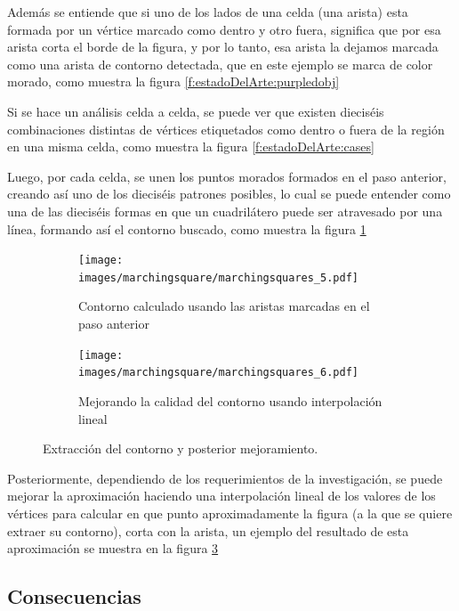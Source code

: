Además se entiende que si uno de los lados de una celda (una arista) esta formada por un
vértice marcado como dentro y otro fuera, significa que por esa arista corta el borde de la figura,
y por lo tanto, esa arista la dejamos marcada como una arista de contorno detectada, que en este
ejemplo se marca de color morado, como muestra la figura \ref{f:estadoDelArte:purpledobj}

Si se hace un análisis celda a celda, se puede ver que existen dieciséis combinaciones distintas de
vértices etiquetados como dentro o fuera de la región en una misma celda, como muestra la figura
\ref{f:estadoDelArte:cases}

Luego, por cada celda, se unen los puntos morados formados en el paso anterior, creando
así uno de los dieciséis patrones posibles, lo cual se puede entender como una de las dieciséis
formas en que un cuadrilátero puede ser atravesado por una línea, formando así el contorno
buscado, como muestra la figura \ref{f:estadoDelArte:connectedobj}

\begin{figure}[t]

	\begin{subfigure}[t]{0.46\textwidth}
	\centering
		\texttt{[image: images/marchingsquare/marchingsquares\_5.pdf]}
	\caption{Contorno calculado usando las aristas marcadas en el paso anterior}
	\label{f:estadoDelArte:connectedobj}
	\end{subfigure}
	\quad
	\begin{subfigure}[t]{0.46\textwidth}
	\centering
		\texttt{[image: images/marchingsquare/marchingsquares\_6.pdf]}
	\caption{Mejorando la calidad del contorno usando interpolación lineal}
	\label{f:estadoDelArte:2Dintersected}
	\end{subfigure}

	\caption{Extracción del contorno y posterior mejoramiento.}

\end{figure}

Posteriormente, dependiendo de los requerimientos de la investigación, se puede mejorar
la aproximación haciendo una interpolación lineal de los valores de los vértices para calcular en
que punto aproximadamente la figura (a la que se quiere extraer su contorno), corta con la arista,
un ejemplo del resultado de esta aproximación se muestra en la figura \ref{f:estadoDelArte:2Dintersected}

\subsection{Consecuencias}
\label{subsec:marchingSquares:consecuencias}

